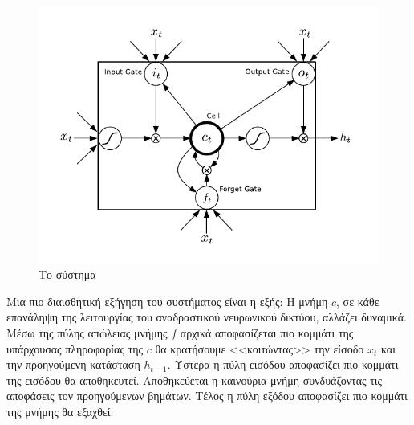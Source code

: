 \begin{figure}[!ht]
	\includegraphics[width=\textwidth, keepaspectratio]{images/lstm.png}
	\centering 
	\caption{Το σύστημα }
	\label{fig:lstm}
\end{figure}

Μια πιο διαισθητική εξήγηση του συστήματος  είναι η εξής:
Η μνήμη $c$, σε κάθε επανάληψη της λειτουργίας του αναδραστικού νευρωνικού δικτύου, αλλάζει δυναμικά.
Μέσω της πύλης απώλειας μνήμης $f$ αρχικά αποφασίζεται πιο κομμάτι της υπάρχουσας πληροφορίας της $c$ θα κρατήσουμε <<κοιτώντας>> την είσοδο $x_t$ και την προηγούμενη κατάσταση $h_{t-1}$. Ύστερα η πύλη εισόδου αποφασίζει πιο κομμάτι της εισόδου θα αποθηκευτεί.
Αποθηκεύεται η καινούρια μνήμη συνδυάζοντας τις αποφάσεις τον προηγούμενων βημάτων. Τέλος η πύλη εξόδου αποφασίζει πιο κομμάτι της μνήμης θα εξαχθεί.

